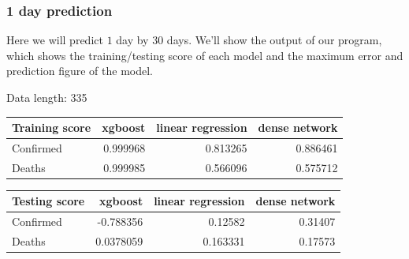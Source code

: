 \documentclass[a4paper,12pt]{article}
\begin{document}
\subsubsection{1 day prediction}
Here we will predict $1$ day by $30$ days. We'll show the output of our program, which shows the training/testing score of each model and the maximum error and prediction figure of the model. 
\begin{tcolorbox}
Data length:	 335

\begin{tabular}{lrrr}
\toprule
 Training score   &   xgboost &   linear regression &   dense network \\
\midrule
 Confirmed        &  0.999968 &            0.813265 &        0.886461 \\
 Deaths           &  0.999985 &            0.566096 &        0.575712 \\
\bottomrule
\end{tabular}


\begin{tabular}{lrrr}
\toprule
 Testing score   &    xgboost &   linear regression &   dense network \\
\midrule
 Confirmed       & -0.788356  &            0.12582  &         0.31407 \\
 Deaths          &  0.0378059 &            0.163331 &         0.17573 \\
\bottomrule
\end{tabular}
\end{tcolorbox}
\end{document}
